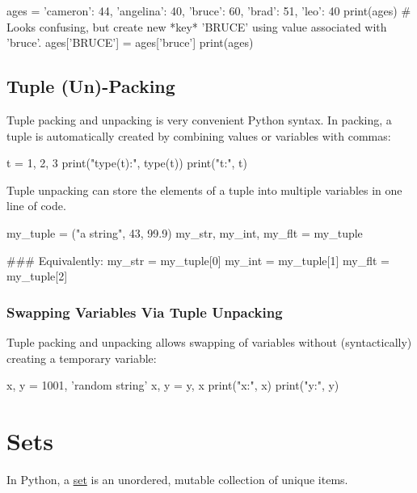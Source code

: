 \documentclass[12pt,letterpaper,twoside]{article}
\begin{document}
\begin{python}
ages = {'cameron': 44, 'angelina': 40, 'bruce': 60, 'brad': 51, 'leo': 40}
print(ages)
# Looks confusing, but create new *key* 'BRUCE' using value associated with 'bruce'.
ages['BRUCE'] = ages['bruce']
print(ages)
\end{python}

\subsection{Tuple (Un)-Packing}

Tuple packing and unpacking is very convenient Python syntax. In
packing, a tuple is automatically created by combining values or
variables with commas:

\begin{python}
t = 1, 2, 3
print("type(t):", type(t))
print("t:", t)
\end{python}

Tuple unpacking can store the elements of a tuple into multiple
variables in one line of code.

\begin{python}
my_tuple = ("a string", 43, 99.9)
my_str, my_int, my_flt = my_tuple

### Equivalently:
my_str = my_tuple[0]
my_int = my_tuple[1]
my_flt = my_tuple[2]
\end{python}

\subsubsection{Swapping Variables Via Tuple Unpacking}

Tuple packing and unpacking allows swapping of variables without (syntactically)
creating a temporary variable:

\begin{python}
x, y = 1001, 'random string'
x, y = y, x
print("x:", x)
print("y:", y)
\end{python}

\vspace{-4ex}
\section{Sets}
\vspace{-2ex}
In Python, a \href{https://docs.python.org/3/tutorial/datastructures.html#sets}{set} is an unordered, 
mutable collection of unique items. 

\vspace{-3ex}
\end{document}
